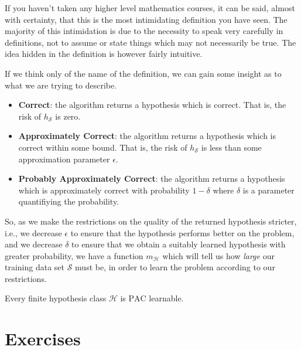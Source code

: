 \begin{remark}
	If you haven't taken any higher level mathematics courses, it can be said, almost with certainty, that this is the most intimidating definition you have seen. The majority of this intimidation is due to the necessity to speak very carefully in definitions, not to assume or state things which may not necessarily be true. The idea hidden in the definition is however fairly intuitive.

	If we think only of the name of the definition, we can gain some insight as to what we are trying to describe.
	\begin{itemize}
		\item \textbf{Correct}: the algorithm returns a hypothesis which is correct. That is, the risk of $ h_{\mathcal{S}} $ is zero.
		\item \textbf{Approximately Correct}: the algorithm returns a hypothesis which is correct within some bound. That is, the risk of $ h_{\mathcal{S}} $ is less than some approximation parameter $ \epsilon $.
		\item \textbf{Probably Approximately Correct}: the algorithm returns a hypothesis which is approximately correct with probability $ 1-\delta $ where $ \delta $ is a parameter quantifiying the probability.
	\end{itemize}

	So, as we make the restrictions on the quality of the returned hypothesis stricter, i.e., we decrease $ \epsilon $ to ensure that the hypothesis performs better on the problem, and we decrease $ \delta $ to ensure that we obtain a suitably learned hypothesis with greater probability, we have a function $ m_{\mathcal{H}} $ which will tell us how \textit{large} our training data set $ \mathcal{S} $ must be, in order to learn the problem according to our restrictions.
\end{remark}

\begin{proposition}
	Every finite hypothesis class $ \mathcal{H} $ is $ \mathrm{PAC} $ learnable.
\end{proposition}

\section{Exercises}
